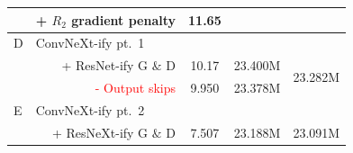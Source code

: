 \begin{table}[t]
{\begin{tabular}{ l r c c c }
   & \textcolor[rgb]{0,0.502,0.502}{+ $R_2$ gradient penalty}                                                                                                                                                                                                                                                                                                                                                                                                & \multirow{1}{*}{11.65} &                          &                           \\ 
\midrule
D  & \multicolumn{1}{l}{ConvNeXt-ify pt.~1}                                                                                                                                                                                                                                                                                                                                                                                                                 &                        &                          &                           \\ 
 & \textcolor[rgb]{0,0.502,0.502}{+ ResNet-ify G $\&$ D}                                                                                                                                                                                                                                                                                                                                                                                                   & 10.17                  & 23.400M                  & \multirow{2}{*}{23.282M}  \\
   & \textcolor{red}{- Output skips}                                                                                                                                                                                                                                                                                                                                                                                                                         & 9.950 & 23.378M &                           \\ 
\midrule
E  & \multicolumn{1}{l}{ConvNeXt-ify pt.~2}                              &                        &                          &                           \\
 & \textcolor[rgb]{0,0.502,0.502}{+ ResNeXt-ify G $\&$ D}                                                                                                                                                                                                                                                                                                                                                                                                  & 7.507                  & 23.188M                  & 23.091M                   \\ 

\end{tabular}}
\end{table}
